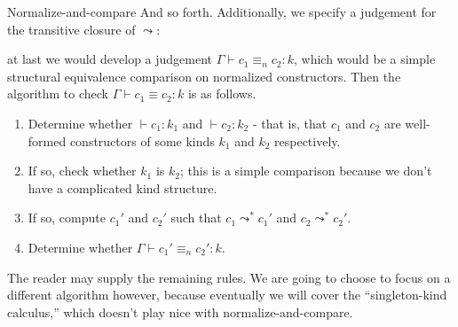 \documentclass{amsart}
\begin{document}
\begin{section}{Normalize-and-compare}
    And so forth. Additionally, we specify a judgement for the transitive closure of $\leadsto$:
    at last we would develop a judgement $\Gamma \vdash c_1 \equiv_n c_2 : k$, which would be a simple structural equivalence comparison on normalized constructors. Then the algorithm to check $\Gamma \vdash c_1 \equiv c_2 : k$ is as follows.
        \begin{enumerate}
            \item Determine whether $\vdash c_1 : k_1$ and $\vdash c_2 : k_2$ - that is, that $c_1$ and $c_2$ are well-formed constructors of some kinds $k_1$ and $k_2$ respectively.
            \item If so, check whether $k_1$ is $k_2$; this is a simple comparison because we don't have a complicated kind structure.
            \item If so, compute $c_1'$ and $c_2'$ such that $c_1 \leadsto^* c_1'$ and $c_2 \leadsto^* c_2'$.
            \item Determine whether $\Gamma \vdash c_1' \equiv_n c_2' : k$.
        \end{enumerate}

    The reader may supply the remaining rules. We are going to choose to focus on a different algorithm however, because eventually we will cover the ``singleton-kind calculus,'' which doesn't play nice with normalize-and-compare.

\end{section}
\end{document}
